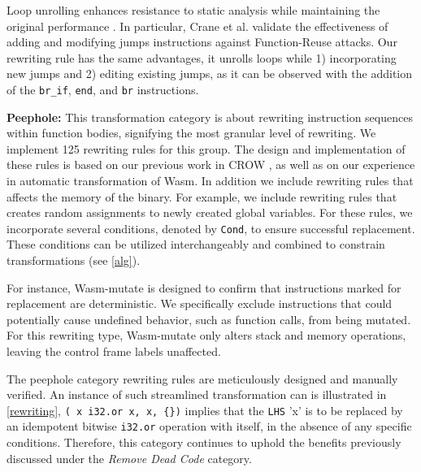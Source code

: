 \documentclass[sigplan,screen]{acmart}
\newcommand*\badge[1]{ \colorbox{red}{\color{white}#1}}
\newcommand{\tool}{Wasm-mutate\xspace}
\newcommand{\wasm}{Wasm\xspace}
\newcommand{\todo}[1]{%
\refstepcounter{todo}
\noindent\textbf{\badge{TODO}} {\color{red}#1}
\addcontentsline{td}{todo}
{\color{red}\thesection.\thetodo\xspace #1}}
\begin{document}
Loop unrolling enhances resistance to static analysis while maintaining the original performance \cite{10.1145/3453483.3454035}. 
In particular, Crane et al. \cite{10.1145/2810103.2813682} validate the effectiveness of adding and modifying jumps instructions against Function-Reuse attacks.
Our rewriting rule has the same advantages, it unrolls loops while 1) incorporating new jumps and 2) editing existing jumps, as it can be observed with the addition of the \texttt{br_if}, \texttt{end}, and \texttt{br} instructions. 



\textbf{Peephole:} 
This transformation category is about rewriting instruction sequences within function bodies, signifying the most granular level of rewriting. 
We implement 125 rewriting rules for this group. 
The design and implementation of these rules is based on our previous work in CROW \cite{arteaga2020crow}, as well as on our experience in automatic transformation of \wasm.
In addition we include rewriting rules that affects the memory of the binary.
For example, we include rewriting rules that creates random assignments to newly created global variables.
For these rules, we incorporate several conditions, denoted by \texttt{Cond}, to ensure successful replacement. 
These conditions can be utilized interchangeably and combined to constrain transformations (see \autoref{alg}).

For instance, \tool is designed to confirm that instructions marked for replacement are deterministic. 
We specifically exclude instructions that could potentially cause undefined behavior, such as function calls, from being mutated. 
For this rewriting type, \tool only alters stack and memory operations, leaving the control frame labels unaffected.

The peephole category rewriting rules are meticulously designed and manually verified. 
An instance of such streamlined transformation can is illustrated in \autoref{rewriting}, \texttt{(\ x\ i32.or\ x, x, \{\})} implies that the \texttt{LHS} 'x' is to be replaced by an idempotent bitwise \texttt{i32.or} operation with itself, in the absence of any specific conditions.
Therefore, this category continues to uphold the benefits previously discussed under the \emph{Remove Dead Code} category.
\end{document}

